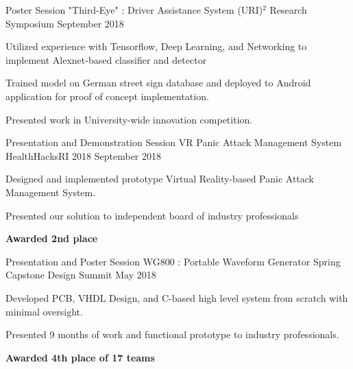 \gradheader
\begin{cventries}
    \cventry
    {Poster Session}
    {"Third-Eye" : Driver Assistance System}
    {(URI)$^2$ Research Symposium}
    {September 2018}
    {
      \begin{cvitems}
        \item{Utilized experience with Tensorflow, Deep Learning, and Networking to implement Alexnet-based classifier and detector}
        \item{Trained model on German street sign database and deployed to Android application for proof of concept implementation.}
        \item{Presented work in University-wide innovation competition.}
      \end{cvitems}
    }
  \cventry
    {Presentation and Demonstration Session}
    {VR Panic Attack Management System}
    {HealthHacksRI 2018}
    {September 2018}
    {
      \begin{cvitems}
        \item {Designed and implemented prototype Virtual Reality-based Panic Attack Management System.}
        \item{Presented our solution to independent board of industry professionals}
        \item{\textbf{Awarded 2nd place}}
      \end{cvitems}
    }
\end{cventries}
\vspace{-10 pt}
\ugradheader
\begin{cventries}
  \cventry
    {Presentation and Poster Session}
    {WG800 : Portable Waveform Generator}
    {Spring Capstone Design Summit}
    {May 2018}
    {
    \begin{cvitems}
      \item{Developed PCB, VHDL Design, and C-based high level system from scratch with minimal oversight.}
      \item{Presented 9 months of work and functional prototype to industry professionals.}
      \item{\textbf{Awarded 4th place of 17 teams}}
    \end{cvitems}
    }
\end{cventries}
\vspace{-10 pt}
